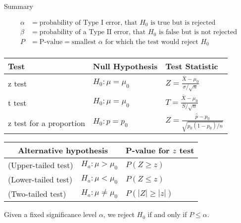 \documentclass{beamer}
\begin{document}
\begin{frame}{Summary}

\vspace{-.6cm}
\begin{align*}
\alpha &= \text{probability of Type I error, that $H_0$ is true but is rejected}\\
\beta &= \text{probability of a Type II error, that $H_0$ is  false but is not rejected}\\
P &= \text{P-value} = \text{smallest $\alpha$ for which the test would reject $H_0$} \\ 
\end{align*}

\vspace{-.8cm}
\begin{center}
\renewcommand*{\arraystretch}{1.4}
\begin{tabular}{|p{.9in}|l|l|} \hline
Test & Null Hypothesis & Test Statistic  \\ \hline
z test & $H_0: \mu=\mu_0$ &$Z=\frac{\overline X-\mu_0}{\sigma/\sqrt{n}}$  \\ \hline
t test & $H_0: \mu=\mu_0$ & $T=\frac{\overline X-\mu_0}{S /\sqrt{n}}$  \\ \hline
z test for a proportion& $H_0: p=p_0$ & $Z=\frac{\hat p-p_0}{\sqrt{p_0(1-p_0)/n}}$  \\ \hline
\end{tabular}

\begin{center}
\renewcommand*{\arraystretch}{1.1}
\begin{tabular}{ll|l}
\multicolumn{2}{c}{Alternative hypothesis} & P-value for $z$ test \\ \hline
(Upper-tailed test) & $H_a: \mu>\mu_0$ & $P(Z\geq z)$ \\
(Lower-tailed test) & $H_a: \mu<\mu_0$ & $P(Z\leq z)$ \\
(Two-tailed test) & $H_a: \mu\neq\mu_0$ & $P(|Z|\geq |z|)$\\
\end{tabular}
\end{center}
\end{center}

Given a fixed significance level $\alpha$, we reject $H_0$ if  and only if $P\leq \alpha$.

\end{frame}


%
%
%
%

%
%
%
\end{document}
